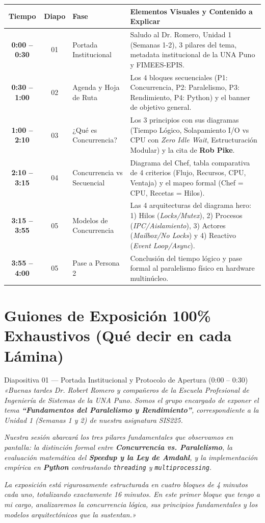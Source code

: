 \documentclass[11pt,a4paper]{article}
\begin{document}
\begin{table}[h!]
\centering
\small
\begin{tabular}{@{}cclp{7.5cm}@{}}
\toprule
\textbf{Tiempo} & \textbf{Diapo} & \textbf{Fase} & \textbf{Elementos Visuales y Contenido a Explicar} \\ \midrule
\textbf{0:00 -- 0:30} & 01 & Portada Institucional & Saludo al Dr. Romero, Unidad 1 (Semanas 1-2), 3 pilares del tema, metadata institucional de la UNA Puno y FIMEES-EPIS. \\
\textbf{0:30 -- 1:00} & 02 & Agenda y Hoja de Ruta & Los 4 bloques secuenciales (P1: Concurrencia, P2: Paralelismo, P3: Rendimiento, P4: Python) y el banner de objetivo general. \\
\textbf{1:00 -- 2:10} & 03 & ¿Qué es Concurrencia? & Los 3 principios con sus diagramas (Tiempo Lógico, Solapamiento I/O vs CPU con \textit{Zero Idle Wait}, Estructuración Modular) y la cita de \textbf{Rob Pike}. \\
\textbf{2:10 -- 3:15} & 04 & Concurrencia vs Secuencial & Diagrama del Chef, tabla comparativa de 4 criterios (Flujo, Recursos, CPU, Ventaja) y el mapeo formal (Chef = CPU, Recetas = Hilos). \\
\textbf{3:15 -- 3:55} & 05 & Modelos de Concurrencia & Las 4 arquitecturas del diagrama hero: 1) Hilos (\textit{Locks/Mutex}), 2) Procesos (\textit{IPC/Aislamiento}), 3) Actores (\textit{Mailbox/No Locks}) y 4) Reactivo (\textit{Event Loop/Async}). \\
\textbf{3:55 -- 4:00} & 05 & Pase a Persona 2 & Conclusión del tiempo lógico y pase formal al paralelismo físico en hardware multinúcleo. \\ \bottomrule
\end{tabular}
\end{table}

\section{Guiones de Exposición 100\% Exhaustivos (Qué decir en cada Lámina)}

\begin{guionbox}{Diapositiva 01 --- Portada Institucional y Protocolo de Apertura (0:00 -- 0:30)}
\textit{«Buenas tardes Dr. Robert Romero y compañeros de la Escuela Profesional de Ingeniería de Sistemas de la UNA Puno. Somos el grupo encargado de exponer el tema \textbf{“Fundamentos del Paralelismo y Rendimiento”}, correspondiente a la Unidad 1 (Semanas 1 y 2) de nuestra asignatura SIS225.}

\textit{Nuestra sesión abarcará los tres pilares fundamentales que observamos en pantalla: la distinción formal entre \textbf{Concurrencia vs. Paralelismo}, la evaluación matemática del \textbf{Speedup y la Ley de Amdahl}, y la implementación empírica en \textbf{Python} contrastando \texttt{threading} y \texttt{multiprocessing}.}

\textit{La exposición está rigurosamente estructurada en cuatro bloques de 4 minutos cada uno, totalizando exactamente 16 minutos. En este primer bloque que tengo a mi cargo, analizaremos la concurrencia lógica, sus principios fundamentales y los modelos arquitectónicos que la sustentan.»}
\end{guionbox}
\end{document}
